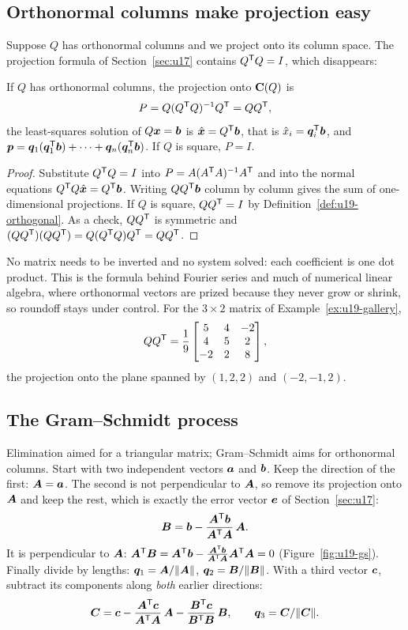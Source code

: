\subsection{Orthonormal columns make projection easy}

Suppose $Q$ has orthonormal columns and we project onto its column space. The projection
formula of Section~\ref{sec:u17} contains $Q^{\mathsf{T}} Q=I$, which disappears:

\begin{proposition}\label{prop:u19-proj}
If $Q$ has orthonormal columns, the projection onto $\mathbf{C}(Q)$ is
\[
  P=Q(Q^{\mathsf{T}} Q)^{-1}Q^{\mathsf{T}}=QQ^{\mathsf{T}} ,
\]
the least-squares solution of $Q\boldsymbol{x}=\boldsymbol{b}$ is $\hat{\boldsymbol{x}}=Q^{\mathsf{T}}\boldsymbol{b}$, that is
$\hat{x}_i=\boldsymbol{q}_i^{\mathsf{T}}\boldsymbol{b}$, and
$\boldsymbol{p}=\boldsymbol{q}_1(\boldsymbol{q}_1^{\mathsf{T}}\boldsymbol{b})+\cdots+\boldsymbol{q}_n(\boldsymbol{q}_n^{\mathsf{T}}\boldsymbol{b})$.
If $Q$ is square, $P=I$.
\end{proposition}

\begin{proof}
Substitute $Q^{\mathsf{T}} Q=I$ into $P=A(A^{\mathsf{T}} A)^{-1}A^{\mathsf{T}}$ and into the normal equations
$Q^{\mathsf{T}} Q\hat{\boldsymbol{x}}=Q^{\mathsf{T}}\boldsymbol{b}$. Writing $QQ^{\mathsf{T}}\boldsymbol{b}$ column by column gives the sum of
one-dimensional projections. If $Q$ is square, $QQ^{\mathsf{T}}=I$ by Definition~\ref{def:u19-orthogonal}.
As a check, $QQ^{\mathsf{T}}$ is symmetric and $(QQ^{\mathsf{T}})(QQ^{\mathsf{T}})=Q(Q^{\mathsf{T}} Q)Q^{\mathsf{T}}=QQ^{\mathsf{T}}$.
\end{proof}

No matrix needs to be inverted and no system solved: each coefficient is one dot product.
This is the formula behind Fourier series and much of numerical linear algebra, where
orthonormal vectors are prized because they never grow or shrink, so roundoff stays under
control. For the $3\times 2$ matrix of Example~\ref{ex:u19-gallery},
\[
  QQ^{\mathsf{T}}=\frac19\begin{bmatrix}5&4&-2\\4&5&2\\-2&2&8\end{bmatrix},
\]
the projection onto the plane spanned by $(1,2,2)$ and $(-2,-1,2)$.

\subsection{The Gram--Schmidt process}

Elimination aimed for a triangular matrix; Gram--Schmidt aims for orthonormal columns. Start
with two independent vectors $\boldsymbol{a}$ and $\boldsymbol{b}$. Keep the direction of the first:
$\boldsymbol{A}=\boldsymbol{a}$. The second is not perpendicular to $\boldsymbol{A}$, so remove its projection onto
$\boldsymbol{A}$ and keep the rest, which is exactly the error vector $\boldsymbol{e}$ of
Section~\ref{sec:u17}:
\[
  \boldsymbol{B}=\boldsymbol{b}-\frac{\boldsymbol{A}^{\mathsf{T}}\boldsymbol{b}}{\boldsymbol{A}^{\mathsf{T}}\boldsymbol{A}}\,\boldsymbol{A}.
\]
It is perpendicular to $\boldsymbol{A}$:
$\boldsymbol{A}^{\mathsf{T}}\boldsymbol{B}=\boldsymbol{A}^{\mathsf{T}}\boldsymbol{b}-\frac{\boldsymbol{A}^{\mathsf{T}}\boldsymbol{b}}{\boldsymbol{A}^{\mathsf{T}}\boldsymbol{A}}\boldsymbol{A}^{\mathsf{T}}\boldsymbol{A}=0$
(Figure~\ref{fig:u19-gs}). Finally divide by lengths:
$\boldsymbol{q}_1=\boldsymbol{A}/\|\boldsymbol{A}\|$, $\boldsymbol{q}_2=\boldsymbol{B}/\|\boldsymbol{B}\|$. With a third vector $\boldsymbol{c}$,
subtract its components along \emph{both} earlier directions:
\[
  \boldsymbol{C}=\boldsymbol{c}-\frac{\boldsymbol{A}^{\mathsf{T}}\boldsymbol{c}}{\boldsymbol{A}^{\mathsf{T}}\boldsymbol{A}}\,\boldsymbol{A}-\frac{\boldsymbol{B}^{\mathsf{T}}\boldsymbol{c}}{\boldsymbol{B}^{\mathsf{T}}\boldsymbol{B}}\,\boldsymbol{B},
  \qquad \boldsymbol{q}_3=\boldsymbol{C}/\|\boldsymbol{C}\|.
\]

